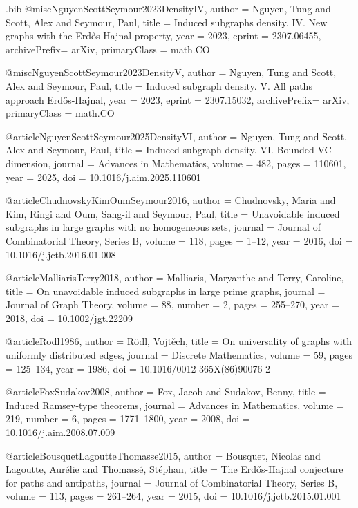 \begin{filecontents*}{\jobname.bib}
@misc{NguyenScottSeymour2023DensityIV,
  author       = {Nguyen, Tung and Scott, Alex and Seymour, Paul},
  title        = {Induced subgraphs density. {IV}. New graphs with the {Erd\H{o}s-Hajnal} property},
  year         = {2023},
  eprint       = {2307.06455},
  archivePrefix= {arXiv},
  primaryClass = {math.CO}
}

@misc{NguyenScottSeymour2023DensityV,
  author       = {Nguyen, Tung and Scott, Alex and Seymour, Paul},
  title        = {Induced subgraph density. {V}. All paths approach {Erd\H{o}s-Hajnal}},
  year         = {2023},
  eprint       = {2307.15032},
  archivePrefix= {arXiv},
  primaryClass = {math.CO}
}

@article{NguyenScottSeymour2025DensityVI,
  author  = {Nguyen, Tung and Scott, Alex and Seymour, Paul},
  title   = {Induced subgraph density. {VI}. Bounded {VC}-dimension},
  journal = {Advances in Mathematics},
  volume  = {482},
  pages   = {110601},
  year    = {2025},
  doi     = {10.1016/j.aim.2025.110601}
}

@article{ChudnovskyKimOumSeymour2016,
  author  = {Chudnovsky, Maria and Kim, Ringi and Oum, Sang-il and Seymour, Paul},
  title   = {Unavoidable induced subgraphs in large graphs with no homogeneous sets},
  journal = {Journal of Combinatorial Theory, Series B},
  volume  = {118},
  pages   = {1--12},
  year    = {2016},
  doi     = {10.1016/j.jctb.2016.01.008}
}

@article{MalliarisTerry2018,
  author  = {Malliaris, Maryanthe and Terry, Caroline},
  title   = {On unavoidable induced subgraphs in large prime graphs},
  journal = {Journal of Graph Theory},
  volume  = {88},
  number  = {2},
  pages   = {255--270},
  year    = {2018},
  doi     = {10.1002/jgt.22209}
}

@article{Rodl1986,
  author  = {R\"odl, Vojt\v{e}ch},
  title   = {On universality of graphs with uniformly distributed edges},
  journal = {Discrete Mathematics},
  volume  = {59},
  pages   = {125--134},
  year    = {1986},
  doi     = {10.1016/0012-365X(86)90076-2}
}

@article{FoxSudakov2008,
  author  = {Fox, Jacob and Sudakov, Benny},
  title   = {Induced {Ramsey}-type theorems},
  journal = {Advances in Mathematics},
  volume  = {219},
  number  = {6},
  pages   = {1771--1800},
  year    = {2008},
  doi     = {10.1016/j.aim.2008.07.009}
}

@article{BousquetLagoutteThomasse2015,
  author  = {Bousquet, Nicolas and Lagoutte, Aur\'elie and Thomass\'e, St\'ephan},
  title   = {The {Erd\H{o}s-Hajnal} conjecture for paths and antipaths},
  journal = {Journal of Combinatorial Theory, Series B},
  volume  = {113},
  pages   = {261--264},
  year    = {2015},
  doi     = {10.1016/j.jctb.2015.01.001}
}


\end{filecontents*}
